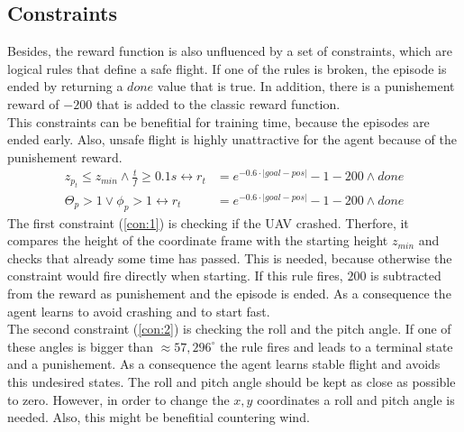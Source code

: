 \subsection{Constraints}
Besides, the reward function is also unfluenced by a set of constraints, which are logical rules that define a safe flight. If one of the rules is broken, the episode is ended by returning a $done$ value that is true. In addition, there is a punishement reward of $-200$ that is added to the classic reward function.\\
This constraints can be benefitial for training time, because the episodes are ended early. Also, unsafe flight is highly unattractive for the agent because of the punishement reward. 
\begin{align}
	z_{p_t} \leq z_{min} \land \frac{t}{f} \geq 0.1 s \leftrightarrow r_t &= e^{-0.6 \cdot |goal - pos|} - 1 -200 \land done \label{con:1}\\
	\Theta_p > 1 \lor \phi_p > 1 \leftrightarrow  r_t &= e^{-0.6 \cdot |goal - pos|} - 1 -200 \land done \label{con:2}
\end{align}
The first constraint (\cref{con:1}) is checking if the UAV crashed. Therfore, it compares the height of the coordinate frame with the starting height $z_{min}$ and checks that already some time has passed. This is needed, because otherwise the constraint would fire directly when starting. If this rule fires, $200$ is subtracted from the reward as punishement and the episode is ended. 
As a consequence the agent learns to avoid crashing and to start fast.\\
The second constraint (\cref{con:2}) is checking the roll and the pitch angle. If one of these angles is bigger than $\approx 57,296^{\circ}$ the rule fires and leads to a terminal state and a punishement. As a consequence the agent learns stable flight and avoids this undesired states. The roll and pitch angle should be kept as close as possible to zero. However, in order to change the $x,y$ coordinates a roll and pitch angle is needed. Also, this might be benefitial countering wind.

\newpage

